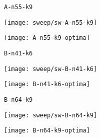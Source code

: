 \begin{figure}[H]
	\begin{minipage}{0.15\textwidth}
		\centering
		\texttt{A-n55-k9}
	\end{minipage}%
	\begin{minipage}{0.40\textwidth}
		\centering
		\texttt{[image: sweep/sw-A-n55-k9]}\par
	\end{minipage}%
	\hspace{0.03\textwidth}
	\begin{minipage}{0.40\textwidth}
		\centering
		\texttt{[image: A-n55-k9-optima]}\par
	\end{minipage}%
\end{figure}

\begin{figure}[H]
	\begin{minipage}{0.15\textwidth}
		\centering
		\texttt{B-n41-k6}
	\end{minipage}%
	\begin{minipage}{0.40\textwidth}
		\centering
		\texttt{[image: sweep/sw-B-n41-k6]}\par
	\end{minipage}%
	\hspace{0.03\textwidth}
	\begin{minipage}{0.40\textwidth}
		\centering
		\texttt{[image: B-n41-k6-optima]}\par
	\end{minipage}%
\end{figure}

\begin{figure}[H]
	\begin{minipage}{0.15\textwidth}
		\centering
		\texttt{B-n64-k9}
	\end{minipage}%
	\begin{minipage}{0.40\textwidth}
		\centering
		\texttt{[image: sweep/sw-B-n64-k9]}\par
	\end{minipage}%
	\hspace{0.03\textwidth}
	\begin{minipage}{0.40\textwidth}
		\centering
		\texttt{[image: B-n64-k9-optima]}\par
	\end{minipage}%
\end{figure}

